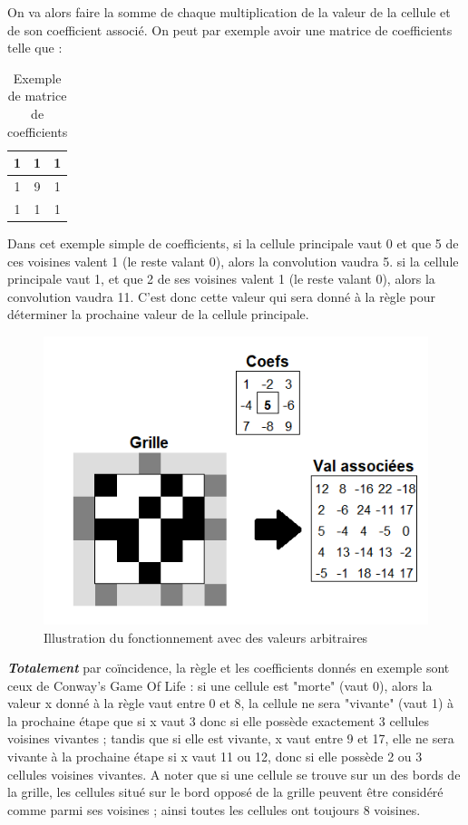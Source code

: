 \par On va alors faire la somme de chaque multiplication de la valeur de la cellule et de son coefficient associé. On peut par exemple avoir une matrice de coefficients telle que :
\begin{table}[htp]
    \centering
    \begin{tabular}{|c|c|c|}
    \hline
    1&1&1\\
    \hline
    1&9&1\\
    \hline
    1&1&1\\
    \hline
    \end{tabular}
    \caption{Exemple de matrice de coefficients}
    \label{tab:tabCoef}
\end{table}
 \par Dans cet exemple simple de coefficients, si la cellule principale vaut 0 et que 5 de ces voisines valent 1 (le reste valant 0), alors la convolution vaudra 5. si la cellule principale vaut 1, et que 2 de ses voisines valent 1 (le reste valant 0), alors la convolution vaudra 11. C'est donc cette valeur qui sera donné à la règle pour déterminer la prochaine valeur de la cellule principale.

 \begin{figure}[H]
        \center
        \includegraphics[scale=0.7]{images/imgAlgoNeural/IllustrationArbitraire.png}
        \caption{Illustration du fonctionnement avec des valeurs arbitraires}
\end{figure}
 
 \par \textbf{\textit{Totalement}} par coïncidence, la règle et les coefficients donnés en exemple sont ceux de Conway's Game Of Life : si une cellule est "morte" (vaut 0), alors la valeur x donné à la règle vaut entre 0 et 8, la cellule ne sera "vivante" (vaut 1) à la prochaine étape que si x vaut 3 donc si elle possède exactement 3 cellules voisines vivantes ; tandis que si elle est vivante, x vaut entre 9 et 17, elle ne sera vivante à la prochaine étape si x vaut 11 ou 12, donc si elle possède 2 ou 3 cellules voisines vivantes. A noter que si une cellule se trouve sur un des bords de la grille, les cellules situé sur le bord opposé de la grille peuvent être considéré comme parmi ses voisines ; ainsi toutes les cellules ont toujours 8 voisines.


